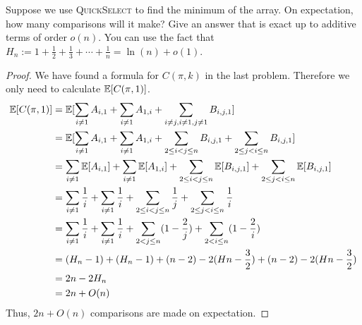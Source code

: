 \documentclass[11pt,a4paper,oneside]{article}
\newcommand{\E}{\mathop{\mathbb{E\/}}}
\begin{document}
\begin{problem}{8}
\statement
Suppose we use \textsc{QuickSelect} to find the minimum of the array. On expectation,
how many comparisons will it make? Give an answer that is exact up to additive terms 
of order $o(n)$.
You can use the fact that $H_n := 1 + \frac{1}{2} + \frac{1}{3} + \cdots  + \frac{1}{n} = \ln(n) + o(1)$.
\solution
\begin{proof}
    We have found a formula for $C(\pi,k)$ in the last problem. Therefore we only need to calculate $\E[C(\pi,1)]$.\\
    \[
        \begin{split}
            \E[C(\pi,1)] &= \E[\sum_{i \not= 1}A_{i, 1} + \sum_{i \not= 1}A_{1, i} + \sum_{i \not= j, i \not= 1,j \not= 1}B_{i, j, 1}]\\
            &= \E[\sum_{i \not= 1}A_{i, 1} + \sum_{i \not= 1}A_{1, i} + \sum_{2 \leq i < j \leq n}B_{i, j, 1} + \sum_{2 \leq j < i \leq n}B_{i, j, 1}]\\
            &= \sum_{i \not= 1} \E[A_{i, 1}] + \sum_{i \not= 1} \E[A_{1, i}] + \sum_{2 \leq i < j \leq n}\E[B_{i, j, 1}] + \sum_{2 \leq j < i \leq n}\E[B_{i, j, 1}]\\
            &= \sum_{i \not= 1} \frac{1}{i} + \sum_{i \not= 1} \frac{1}{i} + \sum_{2 \leq i < j \leq n} \frac{1}{j} + \sum_{2 \leq j < i \leq n}\frac{1}{i}\\
            &= \sum_{i \not= 1} \frac{1}{i} + \sum_{i \not= 1} \frac{1}{i} + \sum_{2 < j \leq n}(1 - \frac{2}{j}) + \sum_{2 < i \leq n}(1 - \frac{2}{i})\\
            &= (H_n - 1) + (H_n - 1) + (n - 2) - 2(Hn - \frac{3}{2}) + (n - 2) - 2(Hn - \frac{3}{2})\\
            &= 2n - 2H_n\\
            &= 2n + O(n)
        \end{split}
    \]
    Thus, $2n + O(n)$ comparisons are made on expectation.
\end{proof}
\end{problem}
\end{document}
